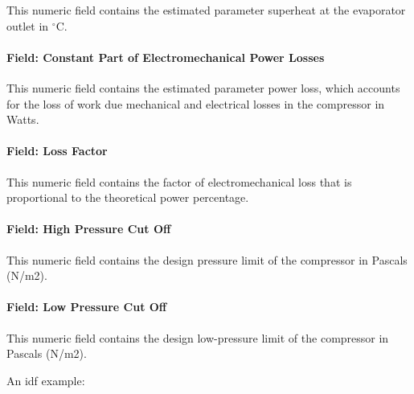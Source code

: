 This numeric field contains the estimated parameter superheat at the evaporator outlet in $^\circ$C.

\paragraph{Field: Constant Part of Electromechanical Power Losses}\label{field-constant-part-of-electromechanical-power-losses}

This numeric field contains the estimated parameter power loss, which accounts for the loss of work due mechanical and electrical losses in the compressor in Watts.

\paragraph{Field: Loss Factor}\label{field-loss-factor}

This numeric field contains the factor of electromechanical loss that is proportional to the theoretical power percentage.

\paragraph{Field: High Pressure Cut Off}\label{field-high-pressure-cut-off}

This numeric field contains the design pressure limit of the compressor in Pascals (N/m2).

\paragraph{Field: Low Pressure Cut Off}\label{field-low-pressure-cut-off}

This numeric field contains the design low-pressure limit of the compressor in Pascals (N/m2).

An idf example:

